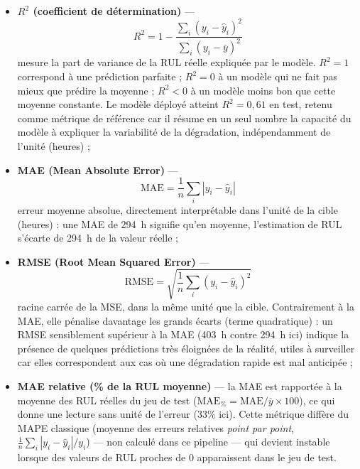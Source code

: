 \documentclass[12pt,a4paper]{report}
\begin{document}
\begin{itemize}
  \item \textbf{$R^2$ (coefficient de détermination)} —
    \begin{equation}
      R^2 = 1 - \frac{\sum_i (y_i - \hat{y}_i)^2}{\sum_i (y_i - \bar{y})^2}
    \end{equation}
    mesure la part de variance de la RUL réelle expliquée par le modèle. $R^2 = 1$
    correspond à une prédiction parfaite ; $R^2 = 0$ à un modèle qui ne fait pas mieux que
    prédire la moyenne ; $R^2 < 0$ à un modèle moins bon que cette moyenne constante. Le
    modèle déployé atteint $R^2 = 0{,}61$ en test, retenu comme métrique de référence car
    il résume en un seul nombre la capacité du modèle à expliquer la variabilité de la
    dégradation, indépendamment de l'unité (heures) ;
  \item \textbf{MAE (Mean Absolute Error)} —
    \begin{equation}
      \text{MAE} = \frac{1}{n}\sum_i |y_i - \hat{y}_i|
    \end{equation}
    erreur moyenne absolue, directement interprétable dans l'unité de la cible (heures) :
    une MAE de 294~h signifie qu'en moyenne, l'estimation de RUL s'écarte de 294~h de la
    valeur réelle ;
  \item \textbf{RMSE (Root Mean Squared Error)} —
    \begin{equation}
      \text{RMSE} = \sqrt{\frac{1}{n}\sum_i (y_i - \hat{y}_i)^2}
    \end{equation}
    racine carrée de la MSE, dans la même unité que la cible. Contrairement à la MAE, elle
    pénalise davantage les grands écarts (terme quadratique) : un RMSE sensiblement
    supérieur à la MAE (403~h contre 294~h ici) indique la présence de quelques prédictions
    très éloignées de la réalité, utiles à surveiller car elles correspondent aux cas où
    une dégradation rapide est mal anticipée ;
  \item \textbf{MAE relative (\% de la RUL moyenne)} — la MAE est rapportée à la moyenne
    des RUL réelles du jeu de test ($\text{MAE}_{\%} = \text{MAE} / \overline{y} \times 100$),
    ce qui donne une lecture sans unité de l'erreur (33\% ici). Cette métrique diffère du
    MAPE classique (moyenne des erreurs relatives \emph{point par point}, $\frac{1}{n}\sum_i
    |y_i-\hat y_i|/y_i$) — non calculé dans ce pipeline — qui devient instable lorsque des
    valeurs de RUL proches de 0 apparaissent dans le jeu de test.
\end{itemize}
\end{document}
